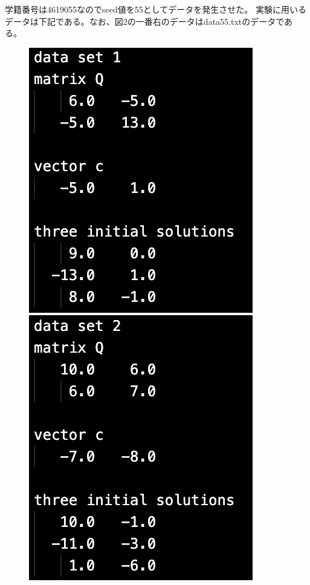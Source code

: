 \documentclass[12pt]{jarticle}
\begin{document}
学籍番号は4619055なのでseed値を55としてデータを発生させた。
実験に用いるデータは下記である。なお、図2の一番右のデータはdata55.txtのデータである。
\begin{figure}[h]
    \begin{minipage}{0.3\hsize}
        \begin{center}
            \includegraphics[scale=0.35]{kadai1_1data1.png}
        \end{center}
    \end{minipage}
    \begin{minipage}{0.3\hsize}
        \begin{center}
            \includegraphics[scale=0.35]{kadai1_1data2.png}

\end{center}
\end{minipage}
\end{figure}
\end{document}
